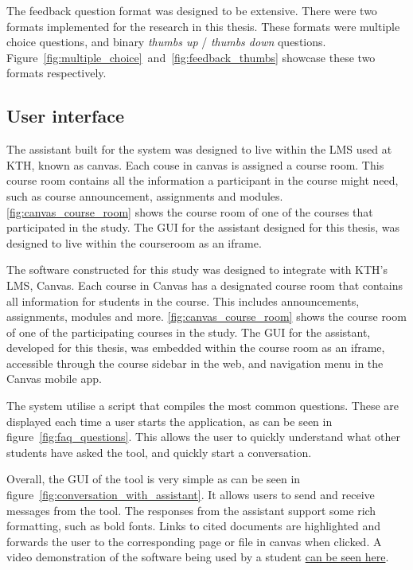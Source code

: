 The feedback question format was designed to be extensive. There were two formats implemented for the research in this thesis. These formats were multiple choice questions, and binary \textit{thumbs up} / \textit{thumbs down} questions. Figure~\ref{fig:multiple_choice}~and~\ref{fig:feedback_thumbs} showcase these two formats respectively.








\subsection{User interface}


The assistant built for the system was designed to live within the \gls{LMS} used at KTH, known as canvas. Each couse in canvas is assigned a course room. This course room contains all the information a participant in the course might need, such as course announcement, assignments and modules. \autoref{fig:canvas_course_room} shows the course room of one of the courses that participated in the study. The \gls{GUI} for the assistant designed for this thesis, was designed to live within the courseroom as an iframe.


The software constructed for this study was designed to integrate with KTH's \gls{LMS}, Canvas. Each course in Canvas has a designated course room that contains all information for students in the course. This includes announcements, assignments, modules and more. \autoref{fig:canvas_course_room} shows the course room of one of the participating courses in the study. The \gls{GUI} for the assistant, developed for this thesis, was embedded within the course room as an iframe, accessible through the course sidebar in the web, and navigation menu in the Canvas mobile app.





% 


The system utilise a script that compiles the most common questions. These are displayed each time a user starts the application, as can be seen in figure~\ref{fig:faq_questions}. This allows the user to quickly understand what other students have asked the tool, and quickly start a conversation.





Overall, the \gls{GUI} of the tool is very simple as can be seen in figure~\ref{fig:conversation_with_assistant}. It allows users to send and receive messages from the tool. The responses from the assistant support some rich formatting, such as bold fonts. Links to cited documents are highlighted and forwards the user to the corresponding page or file in canvas when clicked. A video demonstration of the software being used by a student \href{https://www.youtube.com/watch?v=spdZ4jwI8mo}{can be seen here}.


